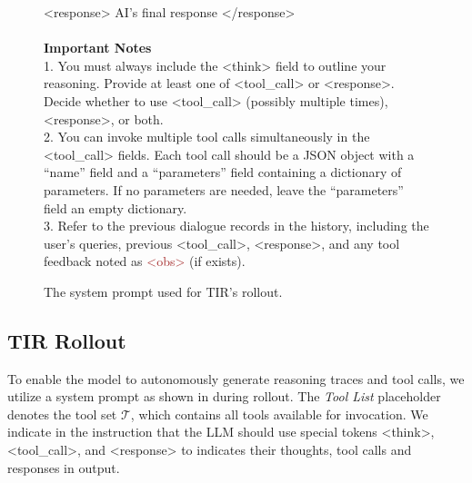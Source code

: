 \begin{figure}[t]
{\begin{tcolorbox}[colback=gray!5!white, colframe=blue!75!black, 
title=System Prompt for Training, boxrule=0.3mm, width=\textwidth, arc=3mm, auto outer arc=true]
\textcolor{deeppurple}{\textless{}response\textgreater{}} AI's final response \textcolor{deeppurple}{\textless{}/response\textgreater{}}\\
\\
\textbf{Important Notes}\\
1. You must always include the \textcolor{deepblue}{\textless{}think\textgreater{}} field to outline your reasoning. Provide at least one of \textcolor{deepgreen}{\textless{}tool\_call\textgreater{}} or \textcolor{deeppurple}{\textless{}response\textgreater{}}. Decide whether to use \textcolor{deepgreen}{\textless{}tool\_call\textgreater{}} (possibly multiple times), \textcolor{deeppurple}{\textless{}response\textgreater{}}, or both.\\
2. You can invoke multiple tool calls simultaneously in the \textcolor{deepgreen}{\textless{}tool\_call\textgreater{}} fields. Each tool call should be a JSON object with a ``name'' field and a ``parameters'' field containing a dictionary of parameters. If no parameters are needed, leave the ``parameters'' field an empty dictionary.\\
3. Refer to the previous dialogue records in the history, including the user's queries, previous \textcolor{deepgreen}{\textless{}tool\_call\textgreater{}}, \textcolor{deeppurple}{\textless{}response\textgreater{}}, and any tool feedback noted as \textcolor{brown}{\textless{}obs\textgreater{}} (if exists).\\
\end{tcolorbox}
}
\caption{The system prompt used for TIR's rollout.}
\label{prompt:system}
\end{figure}


\subsection{TIR Rollout}
\label{sec:tir_rollout}
To enable the model to autonomously generate reasoning traces and tool calls, we utilize a system prompt as shown in  during rollout. The \textit{Tool List} placeholder denotes the tool set \(\mathcal{T}\), which contains all tools available for invocation. We indicate in the instruction that the LLM should use special tokens \textcolor{deepblue}{\textless{}think\textgreater{}}, \textcolor{deepgreen}{\textless{}tool\_call\textgreater{}}, and \textcolor{deeppurple}{\textless{}response\textgreater{}} to indicates their thoughts, tool calls and responses in output.

